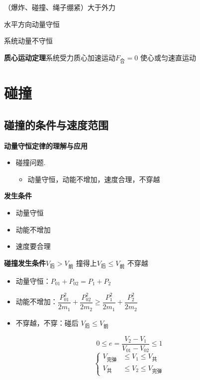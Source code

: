 （爆炸、碰撞、绳子绷紧）大于外力

水平方向动量守恒

系统动量不守恒

\textbf{质心运动定理}\quad 系统受力\quad 质心加速运动\quad $F_{\text{合}}=0$ 使心或匀速直运动


\section{碰撞}
\subsection{碰撞的条件与速度范围}
\textbf{动量守恒定律的理解与应用}
\begin{itemize}
\item 碰撞问题.
  \begin{itemize}
  \item 动量守恒，动能不增加，速度合理，不穿越
  \end{itemize}
\end{itemize}

\textbf{发生条件}
\begin{itemize}
\item 动量守恒
\item 动能不增加
\item 速度要合理
\end{itemize}

\textbf{碰撞发生条件}\quad $V_{\text{后}}>V_{\text{前}}$ 撞得上\quad $V_{\text{后}}\le V_{\text{前}}$ 不穿越
\begin{itemize}
\item 动量守恒：$P_{01}+P_{02}=P_1+P_2$
\item 动能不增加：$\dfrac{P_{01}^2}{2m_1}+\dfrac{P_{02}^2}{2m_2}\ge\dfrac{P_1^2}{2m_1}+\dfrac{P_2^2}{2m_2}$ %
\item 不穿越，不穿：碰后 $V_{\text{后}}\le V_{\text{前}}$
\end{itemize}
\[
0\le e=\frac{V_2-V_1}{V_{01}-V_{02}}\le1
\]
\[
\left\{\begin{aligned}
V_{\text{完弹}}&\le V_1\le V_{\text{共}}\\
V_{\text{共}}&\le V_2\le V_{\text{完弹}}
\end{aligned}\right.
\]

